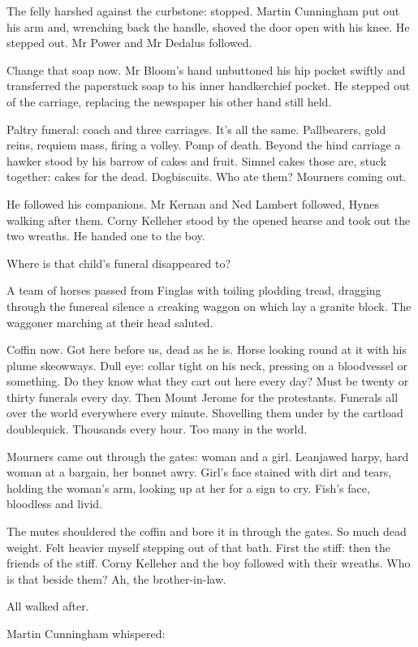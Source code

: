 The felly harshed against the curbstone:
stopped.
Martin Cunningham put out his arm
and, wrenching back the handle,
shoved the door open with his knee.
He stepped out.
Mr Power and Mr Dedalus followed.

Change that soap now.
Mr Bloom's hand unbuttoned his hip pocket swiftly
and transferred the paperstuck soap to his inner handkerchief pocket.
He stepped out of the carriage,
replacing the newspaper his other hand still held.

Paltry funeral:
coach and three carriages.
It's all the same.
Pallbearers, gold reins, requiem mass, firing a volley.
Pomp of death.
Beyond the hind carriage
a hawker stood by his barrow of cakes and fruit.
Simnel cakes those are, stuck together:
cakes for the dead.
Dogbiscuits.
Who ate them?
Mourners coming out.

He followed his companions.
Mr Kernan and Ned Lambert followed,
Hynes walking after them.
Corny Kelleher stood by the opened hearse and took out the two wreaths.
He handed one to the boy.

Where is that child's funeral disappeared to?

A team of horses passed from Finglas with toiling plodding tread,
dragging through the funereal silence a creaking waggon
on which lay a granite block.
The waggoner marching at their head saluted.

Coffin now.
Got here before us, dead as he is.
Horse looking round at it with his plume skeowways.
Dull eye:
collar tight on his neck,
pressing on a bloodvessel or something.
Do they know what they cart out here every day?
Must be twenty or thirty funerals every day.
Then Mount Jerome for the protestants.
Funerals all over the world
everywhere every minute.
Shovelling them under by the cartload doublequick.
Thousands every hour.
Too many in the world.

Mourners came out through the gates:
woman and a girl.
Leanjawed harpy, hard woman at a bargain, her bonnet awry.
Girl's face stained with dirt and tears,
holding the woman's arm, looking up at her for a sign to cry.
Fish's face, bloodless and livid.

The mutes shouldered the coffin and bore it in through the gates.
So much dead weight.
Felt heavier myself stepping out of that bath.
First the stiff:
then the friends of the stiff.
Corny Kelleher and the boy followed with their wreaths.
Who is that beside them?
Ah, the brother-in-law.

All walked after.

Martin Cunningham whispered:


